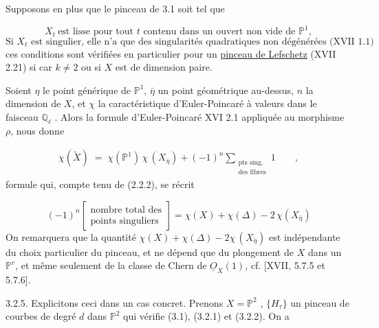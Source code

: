 Supposons en plus que le pinceau de 3.1 soit tel que

\begin{equation}\tag{3.2.1}
X_t \ \text{est lisse pour tout } t \text{ contenu dans un ouvert non vide de } \mathbb{P}^1 ,
\end{equation}
\begin{equation}\tag{3.2.2}
\text{Si } X_t \text{ est singulier, elle n'a que des singularités quadratiques non dégénérées (XVII 1.1) ;}
\end{equation}
ces conditions sont vérifiées en particulier pour un \underline{pinceau de Lefschetz} (XVII 2.21) si car $k \neq 2$ ou si $X$ est de dimension paire.

Soient $\eta$ le point générique de $\mathbb{P}^1$, $\bar{\eta}$ un point géométrique au-dessus, $n$ la dimension de $X$, et $\chi$ la caractéristique d'Euler-Poincaré à valeurs dans le faisceau $\mathbb{Q}_\ell$ . Alors la formule d'Euler-Poincaré XVI 2.1 appliquée au morphisme $\rho$, nous donne

\begin{multline}\tag{3.2.3}
\chi(\widetilde{X}) \;=\; \chi(\mathbb{P}^1)\, \chi\,(X_{\bar{\eta}}) + (-1)^{n} \sum_{\substack{\text{pts sing.}\\ \text{des fibres}}} 1 \qquad ,
\end{multline}
formule qui, compte tenu de (2.2.2), se récrit

\begin{equation}\tag{3.2.4}
(-1)^{n} \left[\begin{array}{c} \text{nombre total des} \\[4pt] \text{points singuliers} \end{array}\right] = \chi(X) + \chi(\Delta) - 2\,\chi(X_{\bar{\eta}})
\end{equation}
On remarquera que la quantité $\chi(X) + \chi(\Delta) - 2\chi\,(X_{\bar{\eta}})$ est indépendante du choix particulier du pinceau, et ne dépend que du plongement de $X$ dans un $\mathbb{P}^r$, et même seulement de la classe de Chern de $\underline{O}_X(1)$, cf. [XVII, 5.7.5 et 5.7.6].



3.2.5. Explicitons ceci dans un cas concret. Prenons $X = \mathbb{P}^2$ , $\{H_\tau\}$ un pinceau de courbes de degré $d$ dans $\mathbb{P}^2$ qui vérifie (3.1), (3.2.1) et (3.2.2). On a

